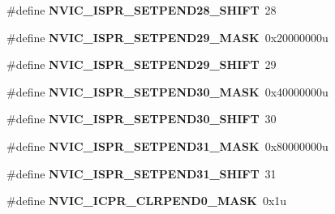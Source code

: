 \begin{DoxyCompactItemize}
\item 
\mbox{\label{group___n_v_i_c___register___masks_ga8557751b3235fdfa36a6817fb926129f}} 
\#define {\bfseries N\+V\+I\+C\+\_\+\+I\+S\+P\+R\+\_\+\+S\+E\+T\+P\+E\+N\+D28\+\_\+\+S\+H\+I\+FT}~28
\item 
\mbox{\label{group___n_v_i_c___register___masks_gaacf44c6ad67c8c2206fe5964d64e0ef3}} 
\#define {\bfseries N\+V\+I\+C\+\_\+\+I\+S\+P\+R\+\_\+\+S\+E\+T\+P\+E\+N\+D29\+\_\+\+M\+A\+SK}~0x20000000u
\item 
\mbox{\label{group___n_v_i_c___register___masks_ga7479d0951ad39aa2098482407b20f043}} 
\#define {\bfseries N\+V\+I\+C\+\_\+\+I\+S\+P\+R\+\_\+\+S\+E\+T\+P\+E\+N\+D29\+\_\+\+S\+H\+I\+FT}~29
\item 
\mbox{\label{group___n_v_i_c___register___masks_ga947ce830a4fd655af727600f0c64a3ef}} 
\#define {\bfseries N\+V\+I\+C\+\_\+\+I\+S\+P\+R\+\_\+\+S\+E\+T\+P\+E\+N\+D30\+\_\+\+M\+A\+SK}~0x40000000u
\item 
\mbox{\label{group___n_v_i_c___register___masks_ga1e5fbceb1576045f6ebc0a6b9f443199}} 
\#define {\bfseries N\+V\+I\+C\+\_\+\+I\+S\+P\+R\+\_\+\+S\+E\+T\+P\+E\+N\+D30\+\_\+\+S\+H\+I\+FT}~30
\item 
\mbox{\label{group___n_v_i_c___register___masks_ga05f82a22cce8445df3daf7058bb7ce9b}} 
\#define {\bfseries N\+V\+I\+C\+\_\+\+I\+S\+P\+R\+\_\+\+S\+E\+T\+P\+E\+N\+D31\+\_\+\+M\+A\+SK}~0x80000000u
\item 
\mbox{\label{group___n_v_i_c___register___masks_ga6cb7e86222fa58880088f838de53fa6a}} 
\#define {\bfseries N\+V\+I\+C\+\_\+\+I\+S\+P\+R\+\_\+\+S\+E\+T\+P\+E\+N\+D31\+\_\+\+S\+H\+I\+FT}~31
\item 
\mbox{\label{group___n_v_i_c___register___masks_ga675324014fd8a7f3e8cdcfdd6c4fe014}} 
\#define {\bfseries N\+V\+I\+C\+\_\+\+I\+C\+P\+R\+\_\+\+C\+L\+R\+P\+E\+N\+D0\+\_\+\+M\+A\+SK}~0x1u
\item 
\mbox{\label{group___n_v_i_c___register___masks_ga93c627b062992fecb45d91091ed61b5a}} 

\end{DoxyCompactItemize}

